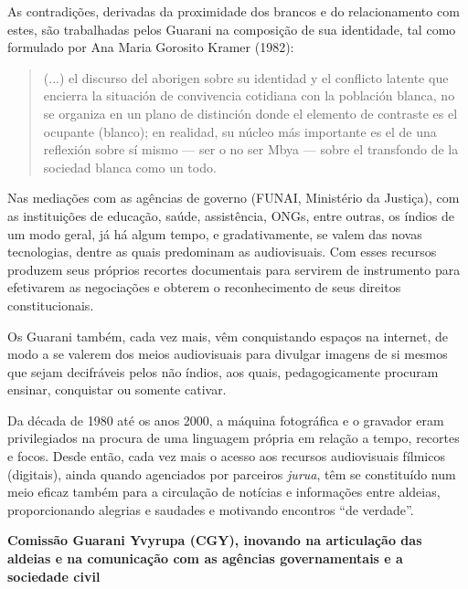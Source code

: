 As contradições, derivadas da proximidade dos brancos e do
relacionamento com estes, são trabalhadas pelos Guarani na composição de
sua identidade, tal como formulado por Ana Maria Gorosito Kramer (1982):

\begin{quote}
(...) el discurso del aborigen sobre su identidad y el conflicto latente
que encierra la situación de convivencia cotidiana con la población
blanca, no se organiza en un plano de distinción donde el elemento de
contraste es el ocupante (blanco); en realidad, su núcleo más importante
es el de una reflexión sobre sí mismo --- ser o no ser Mbya --- sobre el
transfondo de la sociedad blanca como un todo.
\end{quote}

Nas mediações com as agências de governo (FUNAI, Ministério da Justiça),
com as instituições de educação, saúde, assistência, ONGs, entre outras,
os índios de um modo geral, já há algum tempo, e gradativamente, se
valem das novas tecnologias, dentre as quais predominam as audiovisuais.
Com esses recursos produzem seus próprios recortes documentais para
servirem de instrumento para efetivarem as negociações e obterem o
reconhecimento de seus direitos constitucionais.

Os Guarani também, cada vez mais, vêm conquistando espaços na internet,
de modo a se valerem dos meios audiovisuais para divulgar imagens de si
mesmos que sejam decifráveis pelos não índios, aos quais,
pedagogicamente procuram ensinar, conquistar ou somente cativar.

Da década de 1980 até os anos 2000, a máquina fotográfica e o gravador
eram privilegiados na procura de uma linguagem própria em relação a
tempo, recortes e focos. Desde então, cada vez mais o acesso aos
recursos audiovisuais fílmicos (digitais), ainda quando agenciados por
parceiros \emph{jurua}, têm se constituído num meio eficaz também para a
circulação de notícias e informações entre aldeias, proporcionando
alegrias e saudades e motivando encontros ``de verdade''.

\textbf{Comissão Guarani Yvyrupa (CGY), inovando na articulação das
aldeias e na comunicação com as agências governamentais e a sociedade
civil}

